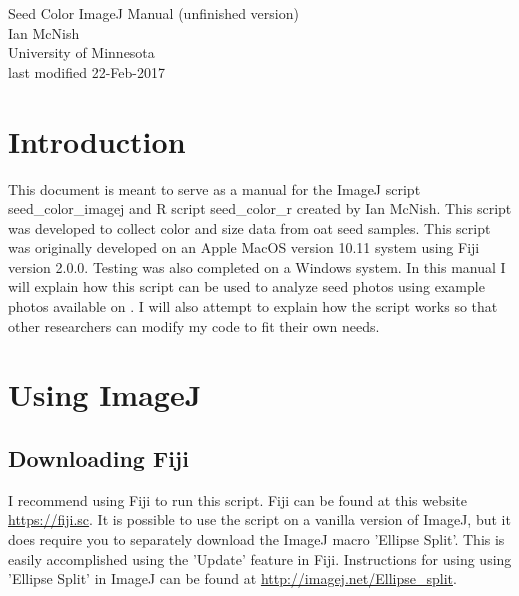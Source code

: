 \documentclass[12pt]{article}
\begin{document}

\begin{titlepage}
\vspace*{2cm}
\begin{center}
\huge{Seed Color ImageJ Manual (unfinished version)}\\
[.75cm]
\large{Ian McNish}\\
\large{University of Minnesota}\\
\large{last modified 22-Feb-2017}
\end{center}

\end{titlepage}


\tableofcontents

\thispagestyle{empty}
\cleardoublepage

\setcounter{page}{1}


\section{Introduction}\label{sec:intro}

\noindent This document is meant to serve as a manual for the ImageJ\cite{schneider2012imagej} script  seed\_color\_imagej and R\cite{r} script seed\_color\_r created by Ian McNish. This script was developed to collect color and size data from oat seed samples. This script was originally developed on an Apple MacOS version 10.11 system using Fiji  version 2.0.0. Testing was also completed on a Windows system. In this manual I will explain how this script can be used to analyze seed photos using example photos available on . I will also attempt to explain how the script works so that other researchers can modify my code to fit their own needs.

\section{Using ImageJ}\label{sec:imagej}

\subsection{Downloading Fiji}\label{sec:fiji}

\noindent I recommend using Fiji to run this script. Fiji can be found at this website \url{https://fiji.sc}. It is possible to use the script on a vanilla version of ImageJ, but it does require you to separately download the ImageJ macro 'Ellipse Split'. This is easily accomplished using the 'Update' feature in Fiji. Instructions for using using 'Ellipse Split' in ImageJ can be found at \url{http://imagej.net/Ellipse_split}.
\end{document}
